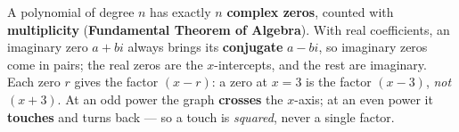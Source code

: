 \documentclass[12pt]{article}
\begin{document}
\vspace{0.14in}

\boxguard[8]
\begin{remindbox}
\small
A polynomial of degree $n$ has exactly $n$ \textbf{complex zeros}, counted with
\textbf{multiplicity} (\textbf{Fundamental Theorem of Algebra}). With real coefficients, an
imaginary zero $a+bi$ always brings its \textbf{conjugate} $a-bi$, so imaginary zeros come in
pairs; the real zeros are the $x$-intercepts, and the rest are imaginary. Each zero $r$ gives the
factor $(x-r)$: a zero at $x=3$ is the factor $(x-3)$, \emph{not} $(x+3)$. At an odd power the
graph \textbf{crosses} the $x$-axis; at an even power it \textbf{touches} and turns back --- so a
touch is \emph{squared}, never a single factor.
\end{remindbox}
\end{document}
